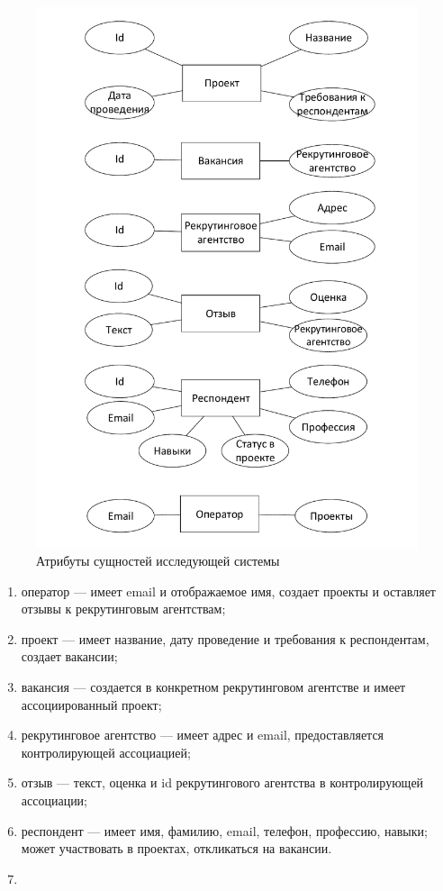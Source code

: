 \begin{figure}[ht]
  \centering
  \includegraphics[width=\textwidth]{include/er-survey-at.pdf}
\caption{Атрибуты сущностей исследующей системы}
\label{fig:er-survey-at}
\end{figure}

\begin{enumerate}
\item оператор — имеет email и отображаемое имя, создает проекты и оставляет отзывы к рекрутинговым агентствам;
\item проект — имеет название, дату проведение и требования к респондентам, создает вакансии;
\item вакансия — создается в конкретном рекрутинговом агентстве и имеет ассоциированный проект;
\item рекрутинговое агентство — имеет адрес и email, предоставляется контролирующей ассоциацией;
\item отзыв — текст, оценка и id рекрутингового агентства в контролирующей ассоциации;
\item респондент — имеет имя, фамилию, email, телефон, профессию, навыки; может участвовать в проектах, откликаться на вакансии.
\item 
\end{enumerate}

